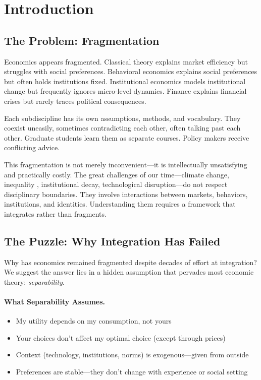 \documentclass[12pt,a4paper]{article}
\begin{document}
\section{Introduction}
\label{sec:introduction}

\subsection{The Problem: Fragmentation}

Economics appears fragmented. Classical theory explains market efficiency but struggles with social preferences. Behavioral economics explains social preferences but often holds institutions fixed. Institutional economics models institutional change but frequently ignores micro-level dynamics. Finance explains financial crises but rarely traces political consequences.

Each subdiscipline has its own assumptions, methods, and vocabulary. They coexist uneasily, sometimes contradicting each other, often talking past each other. Graduate students learn them as separate courses. Policy makers receive conflicting advice.

This fragmentation is not merely inconvenient---it is intellectually unsatisfying and practically costly. The great challenges of our time---climate change, inequality \citep{piketty2014}, institutional decay, technological disruption---do not respect disciplinary boundaries. They involve interactions between markets, behaviors, institutions, and identities. Understanding them requires a framework that integrates rather than fragments.

\subsection{The Puzzle: Why Integration Has Failed}

Why has economics remained fragmented despite decades of effort at integration? We suggest the answer lies in a hidden assumption that pervades most economic theory: \emph{separability}.

\paragraph{What Separability Assumes.}
\begin{itemize}
  \item My utility depends on my consumption, not yours
  \item Your choices don't affect my optimal choice (except through prices)
  \item Context (technology, institutions, norms) is exogenous---given from outside
  \item Preferences are stable---they don't change with experience or social setting
\end{itemize}
\end{document}
